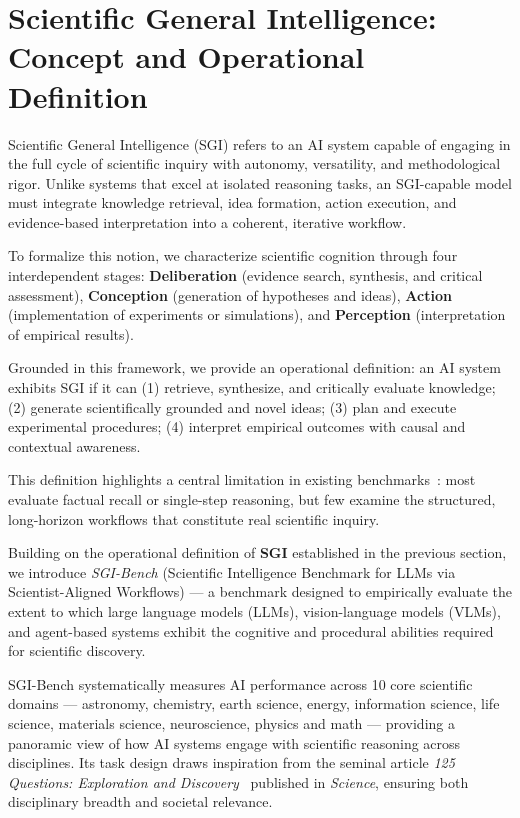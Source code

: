 \section{Scientific General Intelligence: Concept and Operational Definition}

Scientific General Intelligence (SGI) refers to an AI system capable of engaging in the full cycle of scientific inquiry with autonomy, versatility, and methodological rigor. Unlike systems that excel at isolated reasoning tasks, an SGI-capable model must integrate knowledge retrieval, idea formation, action execution, and evidence-based interpretation into a coherent, iterative workflow.

To formalize this notion, we characterize scientific cognition through four interdependent stages: \textbf{Deliberation} (evidence search, synthesis, and critical assessment), \textbf{Conception} (generation of hypotheses and ideas), \textbf{Action} (implementation of experiments or simulations), and \textbf{Perception} (interpretation of empirical results). 

Grounded in this framework, we provide an operational definition: an AI system exhibits SGI if it can (1) retrieve, synthesize, and critically evaluate knowledge; (2) generate scientifically grounded and novel ideas; (3) plan and execute experimental procedures; (4) interpret empirical outcomes with causal and contextual awareness.

This definition highlights a central limitation in existing benchmarks~\cite{hendrycks2020measuring, du2025supergpqa, mialon2023gaia, phan2025humanity}: most evaluate factual recall or single-step reasoning, but few examine the structured, long-horizon workflows that constitute real scientific inquiry. 

Building on the operational definition of \textbf{SGI} established in the previous section, we introduce \textit{SGI-Bench} (Scientific Intelligence Benchmark for LLMs via Scientist-Aligned Workflows) — a benchmark designed to empirically evaluate the extent to which large language models (LLMs), vision-language models (VLMs), and agent-based systems exhibit the cognitive and procedural abilities required for scientific discovery. 

SGI-Bench systematically measures AI performance across 10 core scientific domains — astronomy, chemistry, earth science, energy, information science, life science, materials science, neuroscience, physics and math — providing a panoramic view of how AI systems engage with scientific reasoning across disciplines. Its task design draws inspiration from the seminal article \textit{125 Questions: Exploration and Discovery}~\cite{sanders2021125} published in \textit{Science}, ensuring both disciplinary breadth and societal relevance. 


